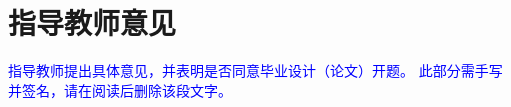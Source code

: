 %
%
%
%

\section{指导教师意见}

\textcolor{blue}{指导教师提出具体意见，并表明是否同意毕业设计（论文）开题。}
\textcolor{blue}{此部分需手写并签名，请在阅读后删除该段文字。}
